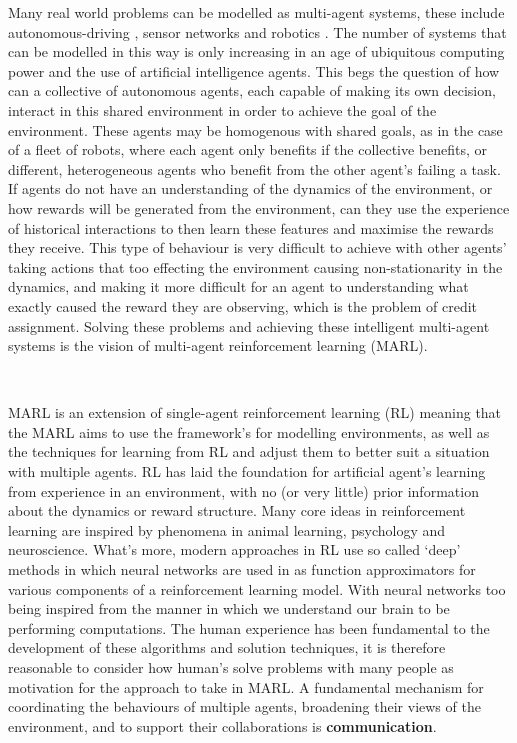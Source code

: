 \documentclass{article}
\begin{document}
Many real world problems can be modelled as multi-agent systems, these include autonomous-driving \citep{shavlev2016safe}, sensor networks \citep{vinyals2014sensor} and robotics \citep{kober2013reinforcement}. The number of systems that can be modelled in this way is only increasing in an age of ubiquitous computing power and the use of artificial intelligence agents. This begs the question of how can a collective of autonomous agents, each capable of making its own decision, interact in this shared environment in order to achieve the goal of the environment. These agents may be homogenous with shared goals, as in the case of a fleet of robots, where each agent only benefits if the collective benefits, or different, heterogeneous agents who benefit from the other agent's failing a task. If agents do not have an understanding of the dynamics of the environment, or how rewards will be generated from the environment, can they use the experience of historical interactions to then learn these features and maximise the rewards they receive. This type of behaviour is very difficult to achieve with other agents' taking actions that too effecting the environment causing non-stationarity in the dynamics, and making it more difficult for an agent to understanding what exactly caused the reward they are observing, which is the problem of credit assignment. Solving these problems and achieving these intelligent multi-agent systems is the vision of multi-agent reinforcement learning (MARL). \citep{albrecht2024marl}

\

MARL is an extension of single-agent reinforcement learning (RL) \citep{sutton2018reinforcement} meaning that the MARL aims to use the framework's for modelling environments, as well as the techniques for learning from RL and adjust them to better suit a situation with multiple agents. RL has laid the foundation for artificial agent's learning from experience in an environment, with no (or very little) prior information about the dynamics or reward structure. Many core ideas in reinforcement learning are inspired by phenomena in animal learning, psychology and neuroscience. \citep{subramanian2020psychological} What's more, modern approaches in RL use so called `deep' methods \citep{wang2024deep} in which neural networks are used in as function approximators for various components of a reinforcement learning model. With neural networks too being inspired from the manner in which we understand our brain to be performing computations. The human experience has been fundamental to the development of these algorithms and solution techniques, it is therefore reasonable to consider how human's solve problems with many people as motivation for the approach to take in MARL. A fundamental mechanism for coordinating the behaviours of multiple agents, broadening their views of the environment, and to support their collaborations is \textbf{communication}. \citep{zhu2024survey}
\end{document}
